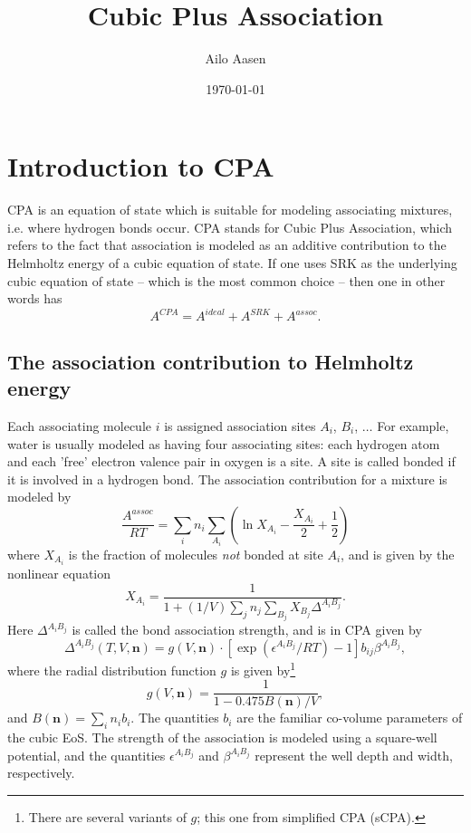 \documentclass[english]{../thermomemo/thermomemo}
\title{Cubic Plus Association}
\author{Ailo Aasen}
\date{\today}
\newcommand{\mbf}[0]{\mathbf}
\newcommand{\lp}{\left(}
\newcommand{\rp}{\right)}
\begin{document}
\frontmatter
\tableofcontents
\section{Introduction to CPA}
CPA is an equation of state which is suitable for modeling associating mixtures, i.e. where hydrogen bonds occur. CPA stands for Cubic Plus Association, which refers to the fact that association is modeled as an additive contribution to the Helmholtz energy of a cubic equation of state. If one uses SRK as the underlying cubic equation of state -- which is the most common choice -- then one in other words has
\begin{equation}
  A^{CPA} = A^{ideal} + A^{SRK} + A^{assoc}.
\end{equation}

\subsection{The association contribution to Helmholtz energy}
Each associating molecule $i$ is assigned association sites $A_i$, $B_i$, $\ldots$ For example, water is usually modeled as having four associating sites: each hydrogen atom and each 'free' electron valence pair in oxygen is a site. A site is called bonded if it is involved in a hydrogen bond. The association contribution for a mixture is modeled by
\begin{equation}
  \frac{A^{assoc}}{RT} = \sum_{i} n_i \sum_{A_i} \lp \ln X_{A_i} - \frac{X_{A_i}}{2} + \frac{1}{2} \rp
\end{equation}
where $X_{A_i}$ is the fraction of molecules \textit{not} bonded at site $A_i$, and is given by the nonlinear equation
\begin{equation}
  X_{A_i} = \frac{1}{1+(1/V) \sum_j n_j \sum_{B_j} X_{B_j} \Delta^{A_i B_j}}.
\end{equation}
Here $\Delta^{A_i B_j}$ is called the bond association strength, and is in CPA given by
\begin{equation}
  \Delta^{A_i B_j}(T,V,\mbf n) = g(V,\mbf n) \cdot [\exp(\epsilon^{A_i B_j}/RT) - 1] b_{ij} \beta^{A_i B_j},
\end{equation}
where the radial distribution function $g$ is given by\footnote{There are several variants of $g$; this one from simplified CPA (sCPA).}
\begin{equation}
  g(V,\mbf n) = \frac{1}{1 - 0.475 B(\mbf n)/V},
\end{equation}
and $B(\mbf n) = \sum_i n_i b_i$. The quantities $b_i$ are the familiar co-volume parameters of the cubic EoS. The strength of the association is modeled using a square-well potential, and the quantities $\epsilon^{A_i B_j}$ and $\beta^{A_i B_j}$ represent the well depth and width, respectively.
\end{document}
